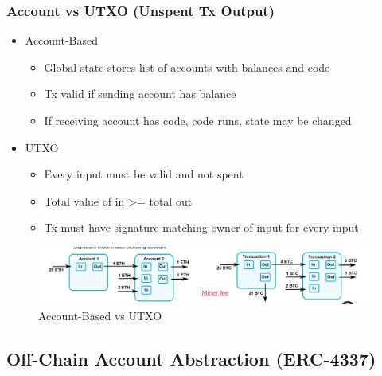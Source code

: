 \documentclass[../Main.tex]{subfiles}
\begin{document}
\subsubsection{Account vs UTXO (Unspent Tx Output)}
\begin{itemize}
    \item Account-Based
          \begin{itemize}
              \item Global state stores list of accounts with balances and code
              \item Tx valid if sending account has balance
              \item If receiving account has code, code runs, state may be changed
          \end{itemize}
    \item UTXO
          \begin{itemize}
              \item Every input must be valid and not spent
              \item Total value of in >= total out
              \item Tx must have signature matching owner of input for every input
          \end{itemize}
\end{itemize}

\begin{figure}[H]
    \centering
    \includegraphics[width=0.75\linewidth]{Images/blockchain/account-utxo.png}
    \caption{Account-Based vs UTXO}
\end{figure}

\subsection{Off-Chain Account Abstraction (ERC-4337)}
\end{document}
